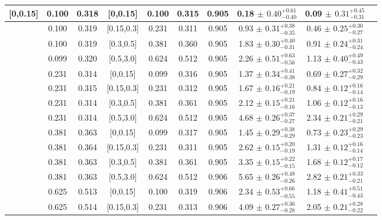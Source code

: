 \begin{table}[H]
\begin{tabular}{|c| c| c| c| c| c| c| c| c| c|}
																													
[0,0.15]	&	0.100	&	0.318	&	[0,0.15]	&	0.100	&	0.315	&	0.905	&	0.18	$\pm$ $	0.40	_{	-0.40	}^{+	0.61	}$&	0.09	$\pm$ $	0.31	_{	-0.31	}^{+	0.45	}$\\ \hline
[0,0.15]	&	0.100	&	0.319	&	[0.15,0.3]	&	0.231	&	0.311	&	0.905	&	0.93	$\pm$ $	0.31	_{	-0.35	}^{+	0.38	}$&	0.46	$\pm$ $	0.25	_{	-0.27	}^{+	0.30	}$\\ \hline
[0,0.15]	&	0.100	&	0.319	&	[0.3,0.5]	&	0.381	&	0.360	&	0.905	&	1.83	$\pm$ $	0.30	_{	-0.31	}^{+	0.40	}$&	0.91	$\pm$ $	0.24	_{	-0.24	}^{+	0.31	}$\\ \hline
[0,0.15]	&	0.099	&	0.320	&	[0.5,3.0]	&	0.624	&	0.512	&	0.905	&	2.26	$\pm$ $	0.51	_{	-0.56	}^{+	0.63	}$&	1.13	$\pm$ $	0.40	_{	-0.43	}^{+	0.49	}$\\ \hline
[0.15,0.3]	&	0.231	&	0.314	&	[0,0.15]	&	0.099	&	0.316	&	0.905	&	1.37	$\pm$ $	0.34	_{	-0.38	}^{+	0.41	}$&	0.69	$\pm$ $	0.27	_{	-0.29	}^{+	0.32	}$\\ \hline
[0.15,0.3]	&	0.231	&	0.315	&	[0.15,0.3]	&	0.231	&	0.312	&	0.905	&	1.67	$\pm$ $	0.16	_{	-0.19	}^{+	0.21	}$&	0.84	$\pm$ $	0.12	_{	-0.14	}^{+	0.16	}$\\ \hline
[0.15,0.3]	&	0.231	&	0.314	&	[0.3,0.5]	&	0.381	&	0.361	&	0.905	&	2.12	$\pm$ $	0.15	_{	-0.16	}^{+	0.21	}$&	1.06	$\pm$ $	0.12	_{	-0.13	}^{+	0.16	}$\\ \hline
[0.15,0.3]	&	0.231	&	0.314	&	[0.5,3.0]	&	0.624	&	0.512	&	0.905	&	4.68	$\pm$ $	0.26	_{	-0.27	}^{+	0.37	}$&	2.34	$\pm$ $	0.21	_{	-0.21	}^{+	0.29	}$\\ \hline
[0.3,0.5]	&	0.381	&	0.363	&	[0,0.15]	&	0.099	&	0.317	&	0.905	&	1.45	$\pm$ $	0.29	_{	-0.29	}^{+	0.38	}$&	0.73	$\pm$ $	0.23	_{	-0.23	}^{+	0.29	}$\\ \hline
[0.3,0.5]	&	0.381	&	0.364	&	[0.15,0.3]	&	0.231	&	0.311	&	0.905	&	2.62	$\pm$ $	0.15	_{	-0.19	}^{+	0.20	}$&	1.31	$\pm$ $	0.12	_{	-0.14	}^{+	0.16	}$\\ \hline
[0.3,0.5]	&	0.381	&	0.363	&	[0.3,0.5]	&	0.381	&	0.361	&	0.905	&	3.35	$\pm$ $	0.15	_{	-0.15	}^{+	0.22	}$&	1.68	$\pm$ $	0.12	_{	-0.12	}^{+	0.17	}$\\ \hline
[0.3,0.5]	&	0.381	&	0.363	&	[0.5,3.0]	&	0.624	&	0.512	&	0.906	&	5.65	$\pm$ $	0.26	_{	-0.26	}^{+	0.48	}$&	2.82	$\pm$ $	0.21	_{	-0.21	}^{+	0.33	}$\\ \hline
[0.5,3.0]	&	0.625	&	0.513	&	[0,0.15]	&	0.100	&	0.319	&	0.906	&	2.34	$\pm$ $	0.53	_{	-0.55	}^{+	0.66	}$&	1.18	$\pm$ $	0.41	_{	-0.43	}^{+	0.51	}$\\ \hline
[0.5,3.0]	&	0.625	&	0.514	&	[0.15,0.3]	&	0.231	&	0.313	&	0.906	&	4.09	$\pm$ $	0.27	_{	-0.28	}^{+	0.36	}$&	2.05	$\pm$ $	0.21	_{	-0.22	}^{+	0.28	}$\\ \hline

\end{tabular}
\end{table}
